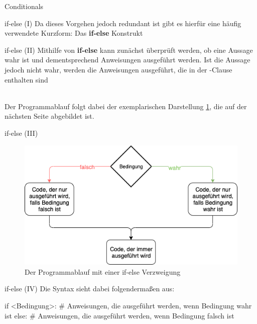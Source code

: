 \begin{subsection}{Conditionals}
\begin{frame}[fragile]{if-else (I)}
            Da dieses Vorgehen jedoch redundant ist gibt es hierfür eine häufig verwendete Kurzform: Das \textbf{if-else} Konstrukt 
                
        \end{frame}
        
        \begin{frame}[fragile]{if-else (II)}
            Mithilfe von \textbf{if-else} kann zunächst überprüft werden, ob eine Aussage wahr ist und dementsprechend Anweisungen ausgeführt werden. Ist die Aussage jedoch nicht wahr, werden die Anweisungen ausgeführt, die in der -Clause enthalten sind \\~\
            
            Der Programmablauf folgt dabei der exemplarischen Darstellung \ref{fig:if-else}, die auf der nächsten Seite abgebildet ist.
        
        \end{frame}
        
         \begin{frame}[fragile]{if-else (III)}
            \begin{figure}
                \centering
                \includegraphics[width=0.7\linewidth, keepaspectratio]{chapters/09_python3_control_flow/figures/if-else.png}
                \caption{Der Programmablauf mit einer if-else Verzweigung}
                \label{fig:if-else}
            \end{figure}
         \end{frame}
         
        \begin{frame}[fragile]{if-else (IV)}
            Die Syntax sieht dabei folgendermaßen aus:
            
\begin{pythoncode}
if <Bedingung>:
    # Anweisungen, die ausgeführt werden, wenn Bedingung wahr ist
else:
    # Anweisungen, die ausgeführt werden, wenn Bedingung falsch ist
    

\end{pythoncode}
\end{frame}
\end{subsection}
